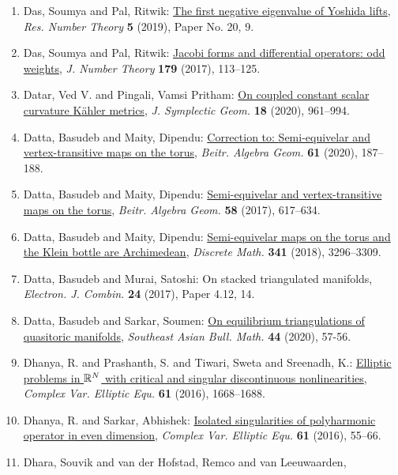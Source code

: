 \begin{enumerate}
{2 in prime powers}, \emph{Acta Arith.} {\bf 183} (2018), 167--172.
\item Das, Soumya and Pal, Ritwik: \href{https://doi.org/10.1007/s40993-019-0158-x}{The first negative eigenvalue of {Y}oshida lifts}, \emph{Res. Number Theory} {\bf 5} (2019), Paper No. 20, 9.
\item Das, Soumya and Pal, Ritwik: \href{https://doi.org/10.1016/j.jnt.2017.03.021}{Jacobi forms and differential operators: odd weights}, \emph{J. Number Theory} {\bf 179} (2017), 113--125.
\item Datar, Ved V. and Pingali, Vamsi Pritham: \href{https://doi.org/10.4310/JSG.2020.v18.n4.a1}{On coupled constant scalar curvature {K}\"{a}hler metrics}, \emph{J. Symplectic Geom.} {\bf 18} (2020), 961--994.
\item Datta, Basudeb and Maity, Dipendu: \href{https://doi.org/10.1007/s13366-019-00458-7}{Correction to: {S}emi-equivelar and vertex-transitive maps on
the torus}, \emph{Beitr. Algebra Geom.} {\bf 61} (2020), 187--188.
\item Datta, Basudeb and Maity, Dipendu: \href{https://doi.org/10.1007/s13366-017-0332-z}{Semi-equivelar and vertex-transitive maps on the torus}, \emph{Beitr. Algebra Geom.} {\bf 58} (2017), 617--634.
\item Datta, Basudeb and Maity, Dipendu: \href{https://doi.org/10.1016/j.disc.2018.08.016}{Semi-equivelar maps on the torus and the {K}lein bottle are
{A}rchimedean}, \emph{Discrete Math.} {\bf 341} (2018), 3296--3309.
\item Datta, Basudeb and Murai, Satoshi: On stacked triangulated manifolds, \emph{Electron. J. Combin.} {\bf 24} (2017), Paper 4.12, 14.
\item Datta, Basudeb and Sarkar, Soumen: \href{https://doi.org/10.1007/jhep01(2020)036}{On equilibrium triangulations of quasitoric manifolds}, \emph{Southeast Asian Bull. Math.} {\bf 44} (2020), 57-56.
\item Dhanya, R. and Prashanth, S. and Tiwari, Sweta and Sreenadh,
K.: \href{https://doi.org/10.1080/17476933.2016.1198787}{Elliptic problems in {${\Bbb R}^N$} with critical and singular
discontinuous nonlinearities}, \emph{Complex Var. Elliptic Equ.} {\bf 61} (2016), 1668--1688.
\item Dhanya, R. and Sarkar, Abhishek: \href{https://doi.org/10.1080/17476933.2015.1055735}{Isolated singularities of polyharmonic operator in even
dimension}, \emph{Complex Var. Elliptic Equ.} {\bf 61} (2016), 55--66.
\item Dhara, Souvik and van der Hofstad, Remco and van Leeuwaarden,

\end{enumerate}
